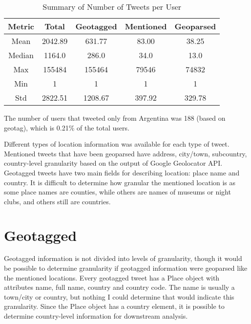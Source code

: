 \begin{table}[htbp]
    \centering
    \begin{tabular}{|c|c|c|c|c|}
    \hline
    \textbf{Metric} & \textbf{Total} & \textbf{Geotagged} & \textbf{Mentioned} & \textbf{Geoparsed}\\
    \hline
    Mean &  2042.89  &  631.77  &  83.00  &  38.25 \\
    
    Median &  1164.0  &  286.0  &  34.0  &  13.0 \\
    
    Max &  155484  &  155464  &  79546  &  74832 \\
    
    Min &  1  &  1  &  1  &  1 \\ 
    
    Std &  2822.51  &  1208.67  &  397.92  &  329.78 \\
    \hline
    \end{tabular}
    \caption{Summary of Number of Tweets per User}
    \label{tab:summary-users}
\end{table}

    

The number of users that tweeted only from Argentina was 188 (based on geotag), which is  0.21\% of the total users.

Different types of location information was available for each type of tweet. Mentioned tweets that have been geoparsed have address, city/town, subcountry, country-level granularity based on the output of Google Geolocator API. Geotagged tweets have two main fields for describing location: place name and country. It is difficult to determine how granular the mentioned location is as some place names are counties, while others are names of museums or night clubs, and others still are countries.

\pagebreak
\section{Geotagged}

Geotagged information is not divided into levels of granularity, though it would be possible to determine granularity if geotagged information were geoparsed like the mentioned locations.
Every geotagged tweet has a Place object with attributes name, full name, country and country code. The name is usually a town/city or country, but nothing I could determine that would indicate this granularity. Since the Place object has a country element, it is possible to determine country-level information for downstream analysis.


